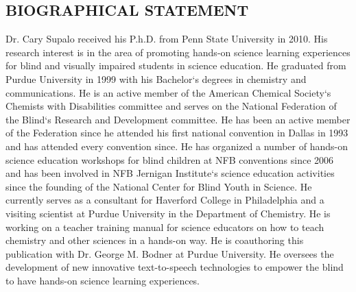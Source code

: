 \documentclass[11.5pt]{sig-alternate} %
\begin{document}
\begin{large}
\clearpage
\leftskip 0in
\parindent 0in 
\section*{BIOGRAPHICAL STATEMENT}
Dr. Cary Supalo received his P.h.D. from Penn State University in 2010. His research interest is in the area of promoting hands-on science learning experiences for blind and visually impaired students in science education. He graduated from Purdue University in 1999 with his Bachelor‘s degrees in chemistry and communications. He is an active member of the American Chemical Society‘s Chemists with Disabilities committee and serves on the National Federation of the Blind‘s Research and Development committee. He has been an active member of the Federation since he attended his first national convention in Dallas in 1993 and has attended every convention since. He has organized a number of hands-on science education workshops for blind children at NFB conventions since 2006 and has been involved in NFB Jernigan Institute‘s science education activities since the founding of the National Center for Blind Youth in Science. He currently serves as a consultant for Haverford College in Philadelphia and a visiting scientist at Purdue University in the Department of Chemistry. He is working on a teacher training manual for science educators on how to teach chemistry and other sciences in a hands-on way. He is coauthoring this publication with Dr. George M. Bodner at Purdue University. He oversees the development of new innovative text-to-speech technologies to empower the blind to have hands-on science learning experiences.

\end{large}
\end{document}
